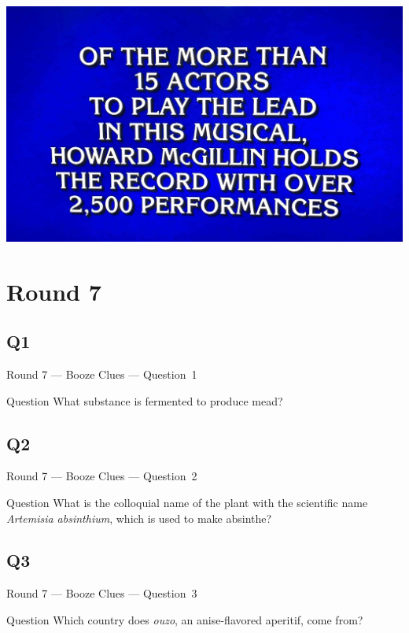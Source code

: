 \documentclass[11pt]{beamer}
\begin{document}
\begin{frame}
\includegraphics[max width=\textwidth,max height=\textheight]{Images/howard.jpg}
\end{frame}
\def\thisSectionName{Booze Clues}
\section{Round 7}
\subsection*{Q1}
\begin{frame}[t]{Round 7 --- Booze Clues --- \mbox{Question 1}}
\vspace{-0.5em}
\begin{block}{Question}
What substance is fermented to produce mead?
\end{block}
\end{frame}
\subsection*{Q2}
\begin{frame}[t]{Round 7 --- Booze Clues --- \mbox{Question 2}}
\vspace{-0.5em}
\begin{block}{Question}
What is the colloquial name of the plant with the scientific name \emph{Artemisia absinthium}, which is used to make absinthe?
\end{block}
\end{frame}
\subsection*{Q3}
\begin{frame}[t]{Round 7 --- Booze Clues --- \mbox{Question 3}}
\vspace{-0.5em}
\begin{block}{Question}
Which country does \emph{ouzo}, an anise-flavored aperitif, come from?
\end{block}
\end{frame}
\end{document}
